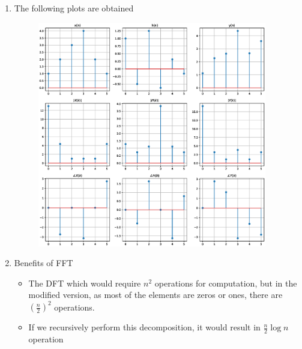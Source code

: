 \documentclass[journal,12pt,twocolumn]{IEEEtran}
\renewcommand\thesection{\arabic{section}}
\begin{document}
\begin{enumerate}[label=\thesection.\arabic*.,ref=\thesection.\theenumi]
\item The following plots are obtained
\begin{figure}[!ht]
	\includegraphics[width=10cm]{./figs/A1_1.eps}
\end{figure}
\item
Benefits of FFT 
\begin{itemize}
    \item The DFT which would require $n^2$ operations for computation, but in the modified version, as most of the elements are zeros or ones, there are $(\frac{n}{2})^2$ operations.
    \item If we recursively perform this decomposition, it would result in $\frac{n}{2}\log{n}$ operation
\end{itemize}
\end{enumerate}
\end{document}
